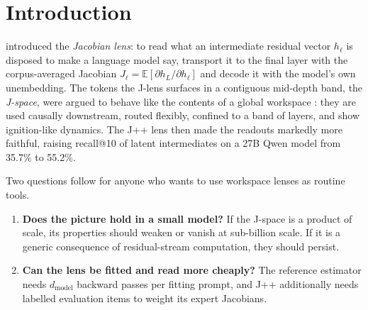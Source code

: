 \documentclass[11pt]{article}
\theoremstyle{definition}
\newcommand{\E}{\mathbb{E}}
\newcommand{\Jl}{J_{\ell}}
\begin{document}
\section{Introduction}

\citet{gurnee2026workspace} introduced the \emph{Jacobian lens}: to read what an intermediate
residual vector $h_\ell$ is disposed to make a language model say, transport it to the final layer
with the corpus-averaged Jacobian $\Jl = \E[\partial h_L / \partial h_\ell]$ and decode it with the
model's own unembedding. The tokens the J-lens surfaces in a contiguous mid-depth band, the
\emph{J-space}, were argued to behave like the contents of a global workspace
\citep{baars1988,dehaene2001}: they are used causally downstream, routed flexibly, confined to a band
of layers, and show ignition-like dynamics. The J++ lens \citep{ayonrinde2026jpp} then made the
readouts markedly more faithful, raising recall@10 of latent intermediates on a 27B Qwen model from
35.7\% to 55.2\%.

Two questions follow for anyone who wants to use workspace lenses as routine tools.
\begin{enumerate}
\item \textbf{Does the picture hold in a small model?} If the J-space is a product of scale, its
properties should weaken or vanish at sub-billion scale. If it is a generic consequence of
residual-stream computation, they should persist.
\item \textbf{Can the lens be fitted and read more cheaply?} The reference estimator needs
$d_{\text{model}}$ backward passes per fitting prompt, and J++ additionally needs labelled
evaluation items to weight its expert Jacobians.
\end{enumerate}
\end{document}
